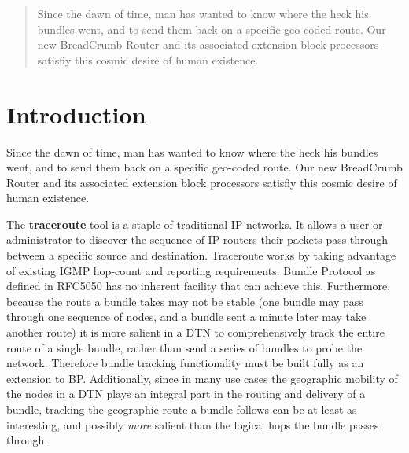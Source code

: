 \documentclass{sig-alternate}
\begin{document}
\CopyrightYear
\crdata


\begin{abstract}
\begin{sloppypar}
Since the dawn of time, man has wanted to know where the heck his bundles went, and to send them back on a specific geo-coded route.  Our new BreadCrumb Router and its associated extension block processors satisfiy this cosmic desire of human existence.  
\end{sloppypar}
\end{abstract}


%
%
\section{Introduction}
Since the dawn of time, man has wanted to know where the heck his bundles went, and to send them back on a specific geo-coded route.  Our new BreadCrumb Router and its associated extension block processors satisfiy this cosmic desire of human existence.  

The {\bf traceroute} tool is a staple of traditional IP networks.  It allows a user or administrator to discover the sequence of IP routers their packets pass through between a specific source and destination.  Traceroute works by taking advantage of existing IGMP hop-count and reporting requirements.  Bundle Protocol as defined in RFC5050 has no inherent facility that can achieve this.  Furthermore, because the route a bundle takes may not be stable (one bundle may pass through one sequence of nodes, and a bundle sent a minute later may take another route) it is more salient in a DTN to comprehensively track the entire route of a single bundle, rather than send a series of bundles to probe the network.  Therefore bundle tracking functionality must be built fully as an extension to BP.  Additionally, since in many use cases the geographic mobility of the nodes in a DTN plays an integral part in the routing and delivery of a bundle, tracking the geographic route a bundle follows can be at least as interesting, and possibly {\it more} salient than the logical hops the bundle passes through.
\end{document}
